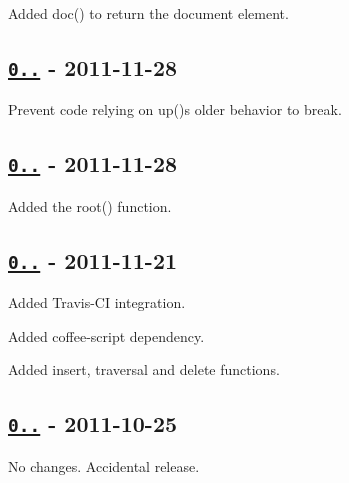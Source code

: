 \begin{DoxyItemize}
\item Added {\ttfamily doc()} to return the document element.
\end{DoxyItemize}

\subsection*{\href{https://github.com/oozcitak/xmlbuilder-js/compare/v0.2.1...v0.2.2}{\tt 0..} -\/ 2011-\/11-\/28}


\begin{DoxyItemize}
\item Prevent code relying on {\ttfamily up()}\textquotesingle{}s older behavior to break.
\end{DoxyItemize}

\subsection*{\href{https://github.com/oozcitak/xmlbuilder-js/compare/v0.2.0...v0.2.1}{\tt 0..} -\/ 2011-\/11-\/28}


\begin{DoxyItemize}
\item Added the {\ttfamily root()} function.
\end{DoxyItemize}

\subsection*{\href{https://github.com/oozcitak/xmlbuilder-js/compare/v0.1.7...v0.2.0}{\tt 0..} -\/ 2011-\/11-\/21}


\begin{DoxyItemize}
\item Added Travis-\/\+CI integration.
\item Added coffee-\/script dependency.
\item Added insert, traversal and delete functions.
\end{DoxyItemize}

\subsection*{\href{https://github.com/oozcitak/xmlbuilder-js/compare/v0.1.6...v0.1.7}{\tt 0..} -\/ 2011-\/10-\/25}


\begin{DoxyItemize}
\item No changes. Accidental release.
\end{DoxyItemize}

